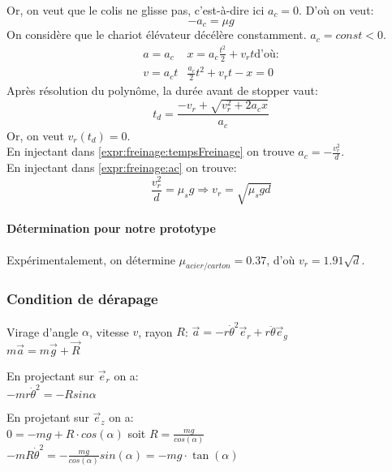 Or, on veut que le colis ne glisse pas, c'est-à-dire ici $a_c=0$. D'où on veut:
\begin{equation}
	\label{expr:freinage:ac}
	-a_c = \mu g
\end{equation}
On considère que le chariot élévateur décélère constamment. $a_c = const < 0$.
\begin{equation}
	\begin{array}{cc}
		a = a_c & x = a_c \frac{t^2}{2} + v_r t \text{d'où:}\\
		v = a_c t & \frac{a_c}{2} t^2 + v_r t - x = 0 \label{equ:freinage:posChariot}
	\end{array}
\end{equation}
Après résolution du polynôme, la durée avant de stopper vaut:
\begin{equation}
	\label{expr:freinage:tempsFreinage}
	t_d = \frac{-v_r + \sqrt{v_r^2 + 2a_c x}}{a_c}
\end{equation}
Or, on veut $v_r(t_d) = 0$.\\
En injectant dans \ref{expr:freinage:tempsFreinage} on trouve $a_c = -\frac{v_r^2}{d}$.\\
En injectant dans \ref{expr:freinage:ac} on trouve:
\begin{equation}
	\label{expr:vitesseMaxLigneDroite}
	\frac{v_r^2}{d} = \mu_s g \Rightarrow v_r = \sqrt{\mu_s gd}
\end{equation}
\paragraph{Détermination pour notre prototype}
Expérimentalement, on détermine $\mu_{acier/carton} = 0.37$, d'où $v_r = 1.91\sqrt{d}$.
\subsubsection{Condition de dérapage}
Virage d'angle $\alpha$, vitesse $v$, rayon $R$:
$\vec a = -r\dot \theta^2 \vec e_r + r \ddot \theta \vec e_g$\\
$m \vec a = m \vec g + \vec R$

En projectant sur $\vec e_r$ on a:\\
$-mr\dot \theta^2 = -R sin\alpha$

En projetant sur $\vec e_z$ on a:\\
$0 = -mg + R\cdot cos(\alpha)$ soit $ R = \frac{mg}{cos(\alpha)}$\\
$-mR\dot \theta^2 = -\frac{mg}{cos(\alpha)}sin(\alpha) = -mg\cdot\tan(\alpha)$

